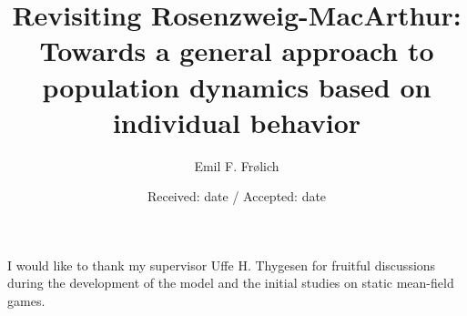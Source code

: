 \documentclass[referee,natbib,smallcondensed]{svjour3}     %
\begin{document}
\title{Revisiting Rosenzweig-MacArthur: Towards a general approach to population dynamics based on individual behavior
}


\author{Emil F. Fr{\o}lich
}



\date{Received: date / Accepted: date}


\maketitle
\newpage
\begin{abstract}
\end{abstract}








\begin{acknowledgements}
I would like to thank my supervisor Uffe H. Thygesen for fruitful discussions during the development of the model and the initial studies on static mean-field games.
\end{acknowledgements}


%
%
\end{document}
